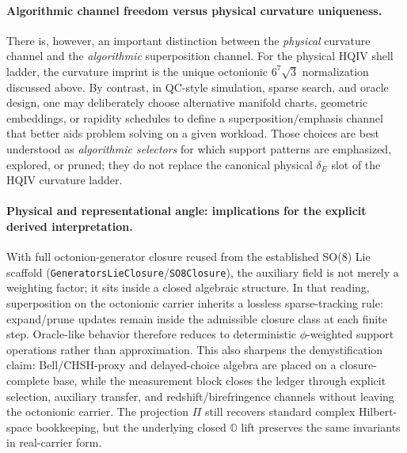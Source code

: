 \documentclass[11pt,a4paper]{article}
\theoremstyle{remark}
\begin{document}
\paragraph{Algorithmic channel freedom versus physical curvature uniqueness.}
There is, however, an important distinction between the \emph{physical} curvature channel and the \emph{algorithmic} superposition channel. For the physical HQIV shell ladder, the curvature imprint is the unique octonionic $6^7\sqrt{3}$ normalization discussed above. By contrast, in QC-style simulation, sparse search, and oracle design, one may deliberately choose alternative manifold charts, geometric embeddings, or rapidity schedules to define a superposition/emphasis channel that better aids problem solving on a given workload. Those choices are best understood as \emph{algorithmic selectors} for which support patterns are emphasized, explored, or pruned; they do not replace the canonical physical $\delta_E$ slot of the HQIV curvature ladder.

\paragraph{Physical and representational angle: implications for the explicit derived interpretation.}
With full octonion-generator closure reused from the established SO(8) Lie scaffold (\texttt{GeneratorsLieClosure}/\texttt{SO8Closure}), the auxiliary field is not merely a weighting factor; it sits inside a closed algebraic structure. In that reading, superposition on the octonionic carrier inherits a lossless sparse-tracking rule: expand/prune updates remain inside the admissible closure class at each finite step. Oracle-like behavior therefore reduces to deterministic $\phi$-weighted support operations rather than approximation. This also sharpens the demystification claim: Bell/CHSH-proxy and delayed-choice algebra are placed on a closure-complete base, while the measurement block closes the ledger through explicit selection, auxiliary transfer, and redshift/birefringence channels without leaving the octonionic carrier. The projection $\Pi$ still recovers standard complex Hilbert-space bookkeeping, but the underlying closed $\mathbb{O}$ lift preserves the same invariants in real-carrier form.
\end{document}
